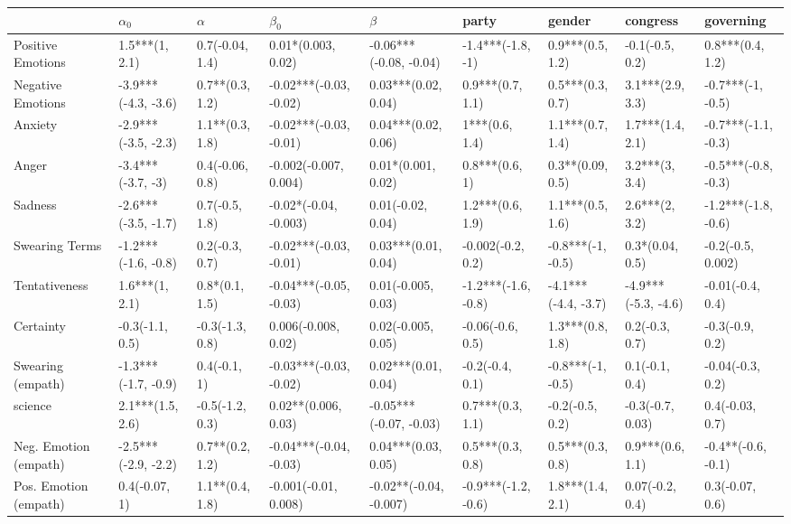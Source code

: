\begin{tabular}{lllllllll}
\toprule
{} &           $\alpha_0$ &         $\alpha$ &               $\beta_0$ &                 $\beta$ &                party &               gender &             congress &            governing \\
\midrule
Positive Emotions     &       1.5***(1, 2.1) &  0.7(-0.04, 1.4) &      0.01*(0.003, 0.02) &  -0.06***(-0.08, -0.04) &    -1.4***(-1.8, -1) &     0.9***(0.5, 1.2) &      -0.1(-0.5, 0.2) &     0.8***(0.4, 1.2) \\
Negative Emotions     &  -3.9***(-4.3, -3.6) &  0.7**(0.3, 1.2) &  -0.02***(-0.03, -0.02) &     0.03***(0.02, 0.04) &     0.9***(0.7, 1.1) &     0.5***(0.3, 0.7) &     3.1***(2.9, 3.3) &    -0.7***(-1, -0.5) \\
Anxiety               &  -2.9***(-3.5, -2.3) &  1.1**(0.3, 1.8) &  -0.02***(-0.03, -0.01) &     0.04***(0.02, 0.06) &       1***(0.6, 1.4) &     1.1***(0.7, 1.4) &     1.7***(1.4, 2.1) &  -0.7***(-1.1, -0.3) \\
Anger                 &    -3.4***(-3.7, -3) &  0.4(-0.06, 0.8) &   -0.002(-0.007, 0.004) &      0.01*(0.001, 0.02) &       0.8***(0.6, 1) &     0.3**(0.09, 0.5) &       3.2***(3, 3.4) &  -0.5***(-0.8, -0.3) \\
Sadness               &  -2.6***(-3.5, -1.7) &   0.7(-0.5, 1.8) &   -0.02*(-0.04, -0.003) &       0.01(-0.02, 0.04) &     1.2***(0.6, 1.9) &     1.1***(0.5, 1.6) &       2.6***(2, 3.2) &  -1.2***(-1.8, -0.6) \\
Swearing Terms        &  -1.2***(-1.6, -0.8) &   0.2(-0.3, 0.7) &  -0.02***(-0.03, -0.01) &     0.03***(0.01, 0.04) &    -0.002(-0.2, 0.2) &    -0.8***(-1, -0.5) &      0.3*(0.04, 0.5) &    -0.2(-0.5, 0.002) \\
Tentativeness         &       1.6***(1, 2.1) &   0.8*(0.1, 1.5) &  -0.04***(-0.05, -0.03) &      0.01(-0.005, 0.03) &  -1.2***(-1.6, -0.8) &  -4.1***(-4.4, -3.7) &  -4.9***(-5.3, -4.6) &     -0.01(-0.4, 0.4) \\
Certainty             &      -0.3(-1.1, 0.5) &  -0.3(-1.3, 0.8) &     0.006(-0.008, 0.02) &      0.02(-0.005, 0.05) &     -0.06(-0.6, 0.5) &     1.3***(0.8, 1.8) &       0.2(-0.3, 0.7) &      -0.3(-0.9, 0.2) \\
Swearing (empath)     &  -1.3***(-1.7, -0.9) &     0.4(-0.1, 1) &  -0.03***(-0.03, -0.02) &     0.02***(0.01, 0.04) &      -0.2(-0.4, 0.1) &    -0.8***(-1, -0.5) &       0.1(-0.1, 0.4) &     -0.04(-0.3, 0.2) \\
science               &     2.1***(1.5, 2.6) &  -0.5(-1.2, 0.3) &     0.02**(0.006, 0.03) &  -0.05***(-0.07, -0.03) &     0.7***(0.3, 1.1) &      -0.2(-0.5, 0.2) &     -0.3(-0.7, 0.03) &      0.4(-0.03, 0.7) \\
Neg. Emotion (empath) &  -2.5***(-2.9, -2.2) &  0.7**(0.2, 1.2) &  -0.04***(-0.04, -0.03) &     0.04***(0.03, 0.05) &     0.5***(0.3, 0.8) &     0.5***(0.3, 0.8) &     0.9***(0.6, 1.1) &   -0.4**(-0.6, -0.1) \\
Pos. Emotion (empath) &        0.4(-0.07, 1) &  1.1**(0.4, 1.8) &    -0.001(-0.01, 0.008) &  -0.02**(-0.04, -0.007) &  -0.9***(-1.2, -0.6) &     1.8***(1.4, 2.1) &      0.07(-0.2, 0.4) &      0.3(-0.07, 0.6) \\
\bottomrule
\end{tabular}
